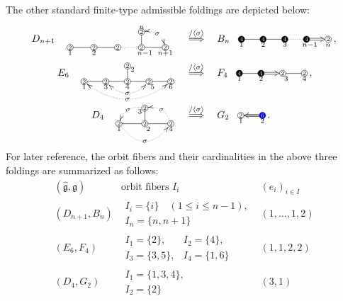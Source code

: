 \documentclass[12pt, leqno]{amsart}
\numberwithin{equation}{section}
\theoremstyle{plain}
\theoremstyle{definition}
\renewcommand{\le}{\leqslant}
\newcommand{\g}{\mathfrak{g}}
\newcommand*\circled[1]{ \fontsize{6}{6}\selectfont \tikz[baseline=(char.base)]{
  \node[shape=circle,draw,inner sep=0.4pt] (char) {#1};} \fontsize{12}{12}\selectfont }
\newcommand*\bcircled[1]{\fontsize{6}{6}\selectfont \tikz[baseline=(char.base)]{
    \node[shape=circle, fill= black, draw=black, text=white,  inner sep=0.4pt] (char) {#1};} \fontsize{12}{12}\selectfont}
\newcommand*\rcircled[1]{\fontsize{6}{6}\selectfont \tikz[baseline=(char.base)]{
    \node[shape=circle, fill= blue, draw=black, text=white, inner sep=0.4pt] (char) {#1};} \fontsize{12}{12}\selectfont}
\newcommand{\hg}{{\widehat{\g}}}
\newcommand{\ang}[1]{\langle#1\rangle}
\begin{document}
The other standard finite-type admissible foldings are depicted below:
\begin{align*}
 D_{n+1}\ \
\raisebox{1em}{
\xymatrix@R=2ex@C=4ex{
&&& *{\circled{2}}<3pt>    \ar@{-}[d]
\ar@/^.6pc/@{<.>}[dr]|{\sigma} \ar@{}[r]^<{n \ \ } & \\
*{\circled{2}}<3pt>  \ar@{-}[r]_<{1\ \ }
& *{\circled{2}}<3pt> \ar@{-}[r]_<{2\ \ }
& *{\circled{2}}<3pt> \ar@{.}[r]
& *{\circled{2}}<3pt> \ar@{-}[r]_>{\ \ n+1}
& *{\circled{2}}<3pt> \ar@{}[l]^>{n-1}
}}
\quad
&\overset{/\ang{\sigma}}{\Longrightarrow}
\quad
B_n\ \
\xymatrix@R=0.5ex@C=3.5ex{
*{\bcircled{4}}<3pt>\ar@{-}[r]_<{1\ \ }
& *{\bcircled{4}}<3pt> \ar@{-}[r]_<{2\ \ }
& *{\bcircled{4}}<3pt> \ar@{.}[r]_<{3\ \ }
& *{\bcircled{4}}<3pt>  \ar@{=>}[r]_>{\ \ \raisebox{-0.16cm}{\scriptsize $n$}}
& *{\circled{2}}<3pt> \ar@{}[l]^>{n-1}
},
\allowdisplaybreaks\\
 E_6\ \
\raisebox{1em}{ \xymatrix@R=2ex@C=3.5ex{
&& *{\circled{2}}<3pt> \ar@{-}[d]^<{2\ \ }\\
*{\circled{2}}<3pt> \ar@{-}[r]_<{1\ \ }
      \ar@/_1.5pc/@{<.>}[rrrr]|{\sigma}
& *{\circled{2}}<3pt> \ar@{-}[r]_<{3\ \ }
      \ar@/_1pc/@{<.>}[rr]|{\sigma}
& *{\circled{2}}<3pt> \ar@{-}[r]_<{4\ \ }
& *{\circled{2}}<3pt> \ar@{-}[r]_>{\ \ 6}
& *{\circled{2}}<3pt> \ar@{}[l]^>{5}
}}
\quad
& \overset{/\ang{\sigma}}{\Longrightarrow}
\quad
F_4\ \
\xymatrix@R=0.5ex@C=3.5ex{
*{\bcircled{4}}<3pt> \ar@{-}[r]_<{1\ \ }
& *{\bcircled{4}}<3pt> \ar@{=>}[r]_<{2\ \ }
& *{\circled{2}}<3pt> \ar@{-}[r]_>{\ \ 4}
& *{\circled{2}}<3pt>
      \ar@{}[l]^>{3}
},
\allowdisplaybreaks\\
 D_4\ \
\raisebox{1em}{
\xymatrix@R=2ex@C=4.5ex{
& *{\circled{2}}<3pt> \ar@{-}[d]_<{3}
      \ar@/^.6pc/@{<.}[dr]|{\sigma}
      \ar@/_.6pc/@{.>}[dl]|{\sigma}
\\
*{\circled{2}}<3pt>
      \ar@{-}[r]_<{1\ \ }
      \ar@/_1.5pc/@{.>}[rr]|{\sigma}
&
*{\circled{2}}<3pt>
      \ar@{-}[r]_>{\ \ 4}
&
*{\circled{2}}<3pt>
      \ar@{}[l]^>{2}
}}
\quad
&\overset{/\ang{\sigma}}{\Longrightarrow}
\quad
G_2\ \
\xymatrix@R=0.5ex@C=3.5ex{
*{\circled{2}}<3pt>
      \ar@{-}[r]_<{1\ \ }
&
*{\rcircled{6}}<3pt>
      \ar@{=>}[l]^<{\ \ 2}
}.
\end{align*}
For later reference, the orbit fibers and their cardinalities in the
above three foldings are summarized as follows:
\[
\begin{array}{c|c|c}
(\hg,\g) & \text{orbit fibers } I_i & (e_i)_{i\in I}
\\ \hline
(D_{n+1},B_n)
&
\begin{array}{l}
I_i=\{i\}\quad(1\le i\le n-1),\\
I_n=\{n,n+1\}
\end{array}
&
(1,\ldots,1,2)
\\[3ex]
(E_6,F_4)
&
\begin{array}{ll}
I_1=\{2\}, & I_2=\{4\},\\
I_3=\{3,5\}, & I_4=\{1,6\}
\end{array}
&
(1,1,2,2)
\\[3ex]
(D_4,G_2)
&
\begin{array}{l}
I_1=\{1,3,4\},\\
I_2=\{2\}
\end{array}
&
(3,1)
\end{array}
\]
\end{document}
